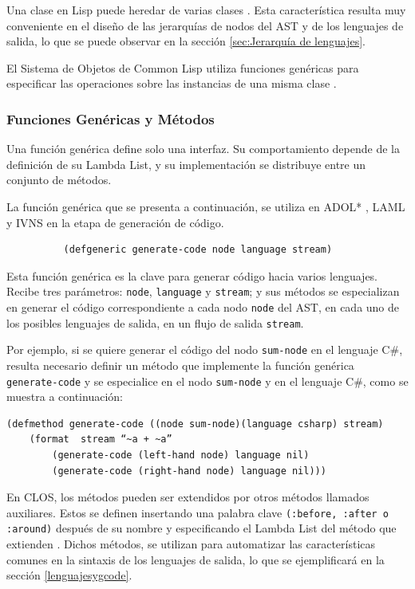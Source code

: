 Una clase en Lisp puede heredar de varias clases \cite{sonya}. Esta característica resulta muy conveniente en el diseño de las jerarquías de nodos del AST y de los lenguajes de salida, lo que se puede observar en la sección \ref{sec:Jerarquía de lenguajes}.

El Sistema de Objetos de Common Lisp utiliza funciones genéricas para especificar las operaciones sobre las instancias de una misma clase \cite{practical-common-lisp}. 

\subsubsection{Funciones Genéricas y Métodos}
Una función genérica define solo una interfaz. Su comportamiento depende de la definición de su Lambda List, y su implementación se distribuye entre un conjunto de métodos\cite{cltl2}.
 
La función genérica que se presenta a continuación, se utiliza en ADOL* \cite{Adol*}, LAML \cite{hoyos} y IVNS \cite{cami} en la etapa de generación de código.
\begin{verbatim}
          (defgeneric generate-code node language stream)
\end{verbatim}

Esta función genérica es la clave para generar código hacia varios lenguajes. Recibe tres parámetros: \texttt{node}, \texttt{language} y \texttt{stream}; y sus métodos se especializan en generar el código correspondiente a cada nodo \texttt{node} del AST, en cada uno de los posibles lenguajes de salida, en un flujo de salida \texttt{stream}.

Por ejemplo, si se quiere generar el código del nodo \texttt{sum-node} en el lenguaje C\#, resulta necesario definir un método que implemente la función genérica \texttt{generate-code} y se especialice en el nodo \texttt{sum-node} y en el lenguaje C\#, como se muestra a continuación:
	
\begin{verbatim}
(defmethod generate-code ((node sum-node)(language csharp) stream)
    (format  stream “~a + ~a”
        (generate-code (left-hand node) language nil)
        (generate-code (right-hand node) language nil)))
\end{verbatim}
En CLOS, los métodos pueden ser extendidos por otros métodos llamados auxiliares\cite{let-over-lambda}. Estos se definen insertando una palabra clave \texttt{(:before, :after o :around)} después de su nombre y especificando el Lambda List del método que extienden \cite{sonya}. Dichos métodos, se utilizan para automatizar las características comunes en la sintaxis de los lenguajes de salida, lo que se ejemplificará en la sección \ref{lenguajesygcode}.


